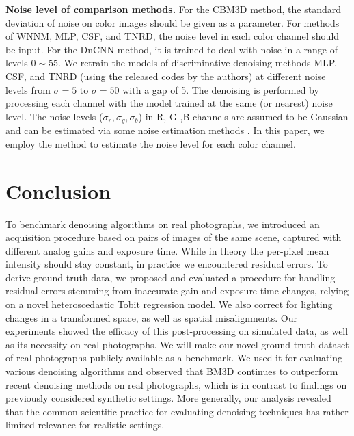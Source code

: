 \textbf{Noise level of comparison methods.} For the CBM3D method, the standard deviation of noise on color images should be given as a parameter. For methods of WNNM, MLP, CSF, and TNRD, the noise level in each color channel should be input. For the DnCNN method, it is trained to deal with noise in a range of levels $0\sim55$. We retrain the models of discriminative denoising methods MLP, CSF, and TNRD (using the released codes by the authors) at different noise levels from $\sigma=5$ to $\sigma=50$ with a gap of 5. The denoising is performed by processing each channel with the model trained at the same (or nearest) noise level. The noise levels ($\sigma_{r}, \sigma_{g}, \sigma_{b}$) in R, G ,B channels are assumed to be Gaussian and can be estimated via some noise estimation methods \cite{noiselevel,Chen2015ICCV}. In this paper, we employ the method \cite{noiselevel} to estimate the noise level for each color channel.








\section{Conclusion}

To benchmark denoising algorithms on real photographs, we introduced an acquisition procedure based on pairs of images of the same scene, captured with different analog
gains and exposure time. While in theory the per-pixel mean intensity should stay constant, in practice we encountered residual errors. To derive ground-truth data, we proposed and evaluated a procedure for handling residual errors stemming from inaccurate gain and exposure time changes, relying on a novel heteroscedastic Tobit regression model. We also correct for lighting changes in a transformed space, as well as spatial misalignments. Our experiments showed the efficacy of this post-processing on simulated data, as well as its necessity on real photographs. We will make our novel ground-truth dataset of real photographs publicly available as a benchmark. We used it for evaluating various denoising algorithms and observed that BM3D continues to outperform recent denoising methods on real photographs, which is in contrast to findings on previously considered synthetic settings. More generally, our analysis revealed that the common scientific practice for evaluating denoising
techniques has rather limited relevance for realistic settings.





















